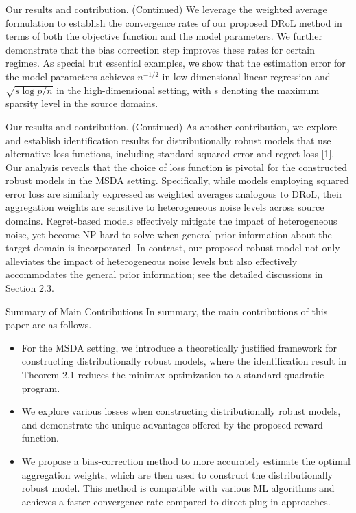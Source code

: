 \documentclass{beamer}
\begin{document}
\begin{frame}{Our results and contribution. (Continued)}
    We leverage the weighted average formulation to establish the convergence rates of our proposed DRoL method in terms of both the objective function and the model parameters. We further demonstrate that the bias correction step improves these rates for certain regimes. As special but essential examples, we show that the estimation error for the model parameters achieves $n ^ { - 1 / 2 }$ in low-dimensional linear regression and $\sqrt { s \log p / n }$ in the high-dimensional setting, with s denoting the maximum sparsity level in the source domains.
\end{frame}

\begin{frame}{Our results and contribution. (Continued)}
    As another contribution, we explore and establish identification results for distributionally robust models that use alternative loss functions, including standard squared error and regret loss [1]. Our analysis reveals that the choice of loss function is pivotal for the constructed robust models in the MSDA setting. Specifically, while models employing squared error loss are similarly expressed as weighted averages analogous to DRoL, their aggregation weights are sensitive to heterogeneous noise levels across source domains. Regret-based models effectively mitigate the impact of heterogeneous noise, yet become NP-hard to solve when general prior information about the target domain is incorporated. In contrast, our proposed robust model not only alleviates the impact of heterogeneous noise levels but also effectively accommodates the general prior information; see the detailed discussions in Section 2.3.
\end{frame}

\begin{frame}{Summary of Main Contributions}
    In summary, the main contributions of this paper are as follows.
    \begin{itemize}
        \item For the MSDA setting, we introduce a theoretically justified framework for constructing distributionally robust models, where the identification result in Theorem 2.1 reduces the minimax optimization to a standard quadratic program.
        \item We explore various losses when constructing distributionally robust models, and demonstrate the unique advantages offered by the proposed reward function.
        \item We propose a bias-correction method to more accurately estimate the optimal aggregation weights, which are then used to construct the distributionally robust model. This method is compatible with various ML algorithms and achieves a faster convergence rate compared to direct plug-in approaches.
    \end{itemize}
\end{frame}
\end{document}
